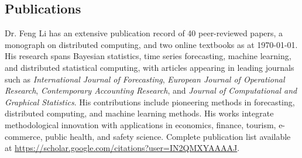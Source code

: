 \documentclass[twoside,a4paper]{article}
\begin{document}
\begin{refsection}
\section{Publications}

Dr. Feng Li has an extensive publication record of 40 peer-reviewed papers, a monograph on distributed computing, and two online textbooks as at \today. His research spans Bayesian statistics, time series forecasting, machine learning, and distributed statistical computing, with articles appearing in leading journals such as \emph{International Journal of Forecasting}, \emph{European Journal of Operational Research}, \emph{Contemporary Accounting Research}, and \emph{Journal of Computational and Graphical Statistics}. His contributions include pioneering methods in forecasting, distributed computing, and machine learning methods. His works integrate methodological innovation with applications in economics, finance, tourism, e-commerce, public health, and safety science. Complete publication list available at  \url{https://scholar.google.com/citations?user=IN2QMXYAAAAJ}.

\nocite{PanZ2025MyopiaHigh}
\nocite{ZhongY2025OptimalStarting}
\nocite{WangWen2025VARX}
\nocite{GaoY2024GridPoint}
\nocite{WangH2024CatastropheDuration}
\nocite{HuangY2024LocalInformation}
\nocite{RenY2023InfiniteForecast}
\nocite{ZhangG2023ProbabilisticForecast}
\nocite{LiF2024ForecasterReview}
\nocite{LiL2023ForecastingLarge}
\nocite{ZhangB2023OptimalReconciliation}
\nocite{LiL2023FeaturebasedIntermittent}
\nocite{WangX2023ForecastCombinations}
\nocite{PanR2022NoteDistributed}
\nocite{LiL2023BayesianForecast}
\nocite{WangZ2022EscalatorAccident}
\nocite{WangX2023DistributedARIMA}
\nocite{AndererM2022HierarchicalForecasting}
\nocite{JanewayMG2021ClinicalDiagnostic}
\nocite{PetropoulosF2022ForecastingTheory}
\nocite{KangY2022ForecastForecasts}
\nocite{TalagalaTS2022FFORMPPFeaturebased}
\nocite{ZhuX2021LeastSquareApproximation}
\nocite{WangX2022UncertaintyEstimation}
\nocite{KangY2021DejaVu}
\nocite{HaoC2020BilinearReduced}
\nocite{LiX2020ForecastingTime}
\nocite{KangY2020GRATISGeneRAting}
\nocite{kang2020statcompcn}
\nocite{kang2020fppcn}
\nocite{KalesanB2020IntersectionsFirearm}
\nocite{BaileyHM2019ChangesPatterns}
\nocite{LiF2019CreditRisk}
\nocite{LiF2018ImprovingForecasting}
\nocite{PinoEC2018CohortProfile}
\nocite{li2016distributedcn}
\nocite{LiF2013BayesianModeling}
\nocite{LiF2013EfficientBayesian}
\nocite{LiF2011ModellingConditional}
\nocite{LiF2010FlexibleModeling}


\end{refsection}
\end{document}

